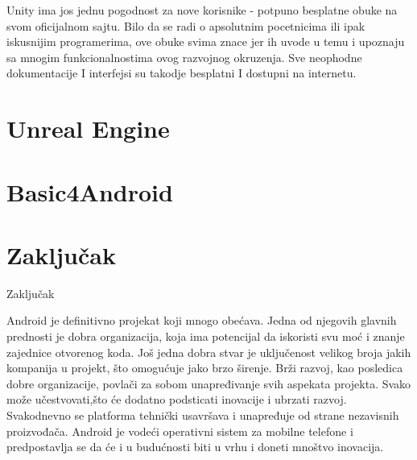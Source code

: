 \documentclass[12pt]{article}
\begin{document}
Unity ima jos jednu pogodnost za nove korisnike - potpuno besplatne obuke na svom oficijalnom sajtu.
Bilo da se radi o apsolutnim pocetnicima ili ipak iskusnijim programerima, ove obuke svima znace jer ih uvode u temu i upoznaju sa mnogim      funkcionalnostima ovog razvojnog okruzenja.
Sve neophodne dokumentacije I interfejsi su takodje besplatni I dostupni na internetu.

\section{Unreal Engine}

\section{Basic4Android}


\section{Zaključak}
Zaključak

Android je definitivno projekat koji mnogo obećava. Jedna od njegovih glavnih prednosti je dobra organizacija, koja ima potencijal da iskoristi svu moć i znanje zajednice otvorenog koda. Još jedna dobra stvar je uključenost velikog broja jakih kompanija u projekt, što omogućuje jako brzo širenje.
Brži razvoj, kao posledica dobre organizacije, povlači za sobom unapređivanje svih aspekata projekta.
Svako može učestvovati,što će dodatno podsticati inovacije i ubrzati razvoj.
Svakodnevno se platforma tehnički usavršava i unapređuje od strane nezavisnih
proizvođača. Android je vodeći operativni sistem za mobilne telefone i predpostavlja se da će
i u budućnosti biti u vrhu i doneti mnoštvo inovacija.

\pagebreak
\begin{thebibliography}{}
\end{thebibliography}
\end{document}
